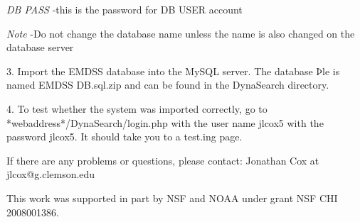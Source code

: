 \documentclass[article]{ij4uq}              %
\begin{document}
\emph{DB PASS} -this is the password for DB USER account
	
\emph{Note} -Do not change the database name unless the name is also changed 
on the database server 

3. Import the EMDSS database into the MySQL server. The database Þle is named EMDSS DB.sql.zip and can be found in the DynaSearch directory. 


4. To test whether the system was imported correctly, go to *webaddress*/DynaSearch/login.php with the user name jlcox5 with the password jlcox5. It should take you to a test.ing page. 

If there are any problems or questions, please contact: 
Jonathan Cox at jlcox@g.clemson.edu 

\acknowledgements

This work was supported in part by NSF and NOAA under grant NSF CHI 2008001386.















\end{document}
